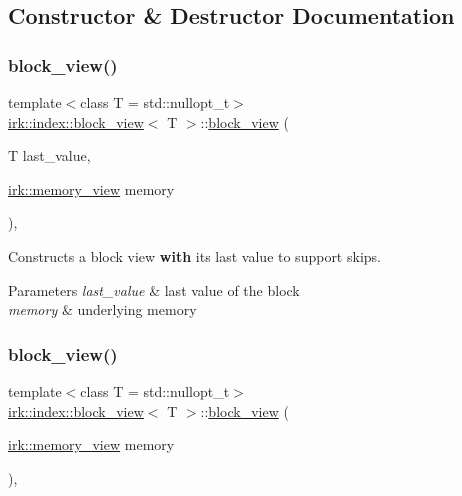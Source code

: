 \subsection{Constructor \& Destructor Documentation}
\mbox{\label{classirk_1_1index_1_1block__view_ac42c1a26fd05c0f53f91cc51cc090e75}} 
\subsubsection{\texorpdfstring{block\+\_\+view()}{block\_view()}\hspace{0.1cm}{\footnotesize\ttfamily [1/2]}}
{\footnotesize\ttfamily template$<$class T  = std\+::nullopt\+\_\+t$>$ \\
\mbox{\hyperlink{classirk_1_1index_1_1block__view}{irk\+::index\+::block\+\_\+view}}$<$ T $>$\+::\mbox{\hyperlink{classirk_1_1index_1_1block__view}{block\+\_\+view}} (\begin{DoxyParamCaption}\item[{T}]{last\+\_\+value,  }\item[{\mbox{\hyperlink{classirk_1_1memory__view}{irk\+::memory\+\_\+view}}}]{memory }\end{DoxyParamCaption})\hspace{0.3cm}{\ttfamily [inline]}, {\ttfamily [explicit]}}

Constructs a block view {\bfseries with} its last value to support skips. 
\begin{DoxyParams}{Parameters}
{\em last\+\_\+value} & last value of the block \\
\hline
{\em memory} & underlying memory \\
\hline
\end{DoxyParams}
\mbox{\label{classirk_1_1index_1_1block__view_aebe22ab369a7a62a205f2b3e4196cc3d}} 
\subsubsection{\texorpdfstring{block\+\_\+view()}{block\_view()}\hspace{0.1cm}{\footnotesize\ttfamily [2/2]}}
{\footnotesize\ttfamily template$<$class T  = std\+::nullopt\+\_\+t$>$ \\
\mbox{\hyperlink{classirk_1_1index_1_1block__view}{irk\+::index\+::block\+\_\+view}}$<$ T $>$\+::\mbox{\hyperlink{classirk_1_1index_1_1block__view}{block\+\_\+view}} (\begin{DoxyParamCaption}\item[{\mbox{\hyperlink{classirk_1_1memory__view}{irk\+::memory\+\_\+view}}}]{memory }\end{DoxyParamCaption})\hspace{0.3cm}{\ttfamily [inline]}, {\ttfamily [explicit]}}

